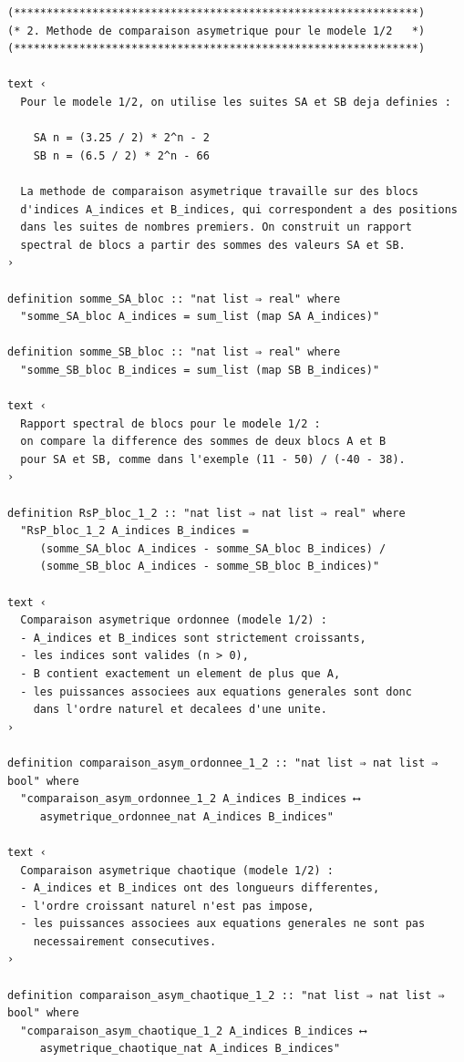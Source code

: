 \documentclass[a4paper,11pt]{article}
\begin{document}
\begin{holcode}[title={\textcolor{white}{File: methode\_spectral.thy -- Part 1/4}}]
\begin{lstlisting}
(**************************************************************)
(* 2. Methode de comparaison asymetrique pour le modele 1/2   *)
(**************************************************************)

text ‹
  Pour le modele 1/2, on utilise les suites SA et SB deja definies :

    SA n = (3.25 / 2) * 2^n - 2
    SB n = (6.5 / 2) * 2^n - 66

  La methode de comparaison asymetrique travaille sur des blocs
  d'indices A_indices et B_indices, qui correspondent a des positions
  dans les suites de nombres premiers. On construit un rapport
  spectral de blocs a partir des sommes des valeurs SA et SB.
›

definition somme_SA_bloc :: "nat list ⇒ real" where
  "somme_SA_bloc A_indices = sum_list (map SA A_indices)"

definition somme_SB_bloc :: "nat list ⇒ real" where
  "somme_SB_bloc B_indices = sum_list (map SB B_indices)"

text ‹
  Rapport spectral de blocs pour le modele 1/2 :
  on compare la difference des sommes de deux blocs A et B
  pour SA et SB, comme dans l'exemple (11 - 50) / (-40 - 38).
›

definition RsP_bloc_1_2 :: "nat list ⇒ nat list ⇒ real" where
  "RsP_bloc_1_2 A_indices B_indices =
     (somme_SA_bloc A_indices - somme_SA_bloc B_indices) /
     (somme_SB_bloc A_indices - somme_SB_bloc B_indices)"

text ‹
  Comparaison asymetrique ordonnee (modele 1/2) :
  - A_indices et B_indices sont strictement croissants,
  - les indices sont valides (n > 0),
  - B contient exactement un element de plus que A,
  - les puissances associees aux equations generales sont donc
    dans l'ordre naturel et decalees d'une unite.
›

definition comparaison_asym_ordonnee_1_2 :: "nat list ⇒ nat list ⇒ bool" where
  "comparaison_asym_ordonnee_1_2 A_indices B_indices ⟷
     asymetrique_ordonnee_nat A_indices B_indices"

text ‹
  Comparaison asymetrique chaotique (modele 1/2) :
  - A_indices et B_indices ont des longueurs differentes,
  - l'ordre croissant naturel n'est pas impose,
  - les puissances associees aux equations generales ne sont pas
    necessairement consecutives.
›

definition comparaison_asym_chaotique_1_2 :: "nat list ⇒ nat list ⇒ bool" where
  "comparaison_asym_chaotique_1_2 A_indices B_indices ⟷
     asymetrique_chaotique_nat A_indices B_indices"


\end{lstlisting}
\end{holcode}
\end{document}
